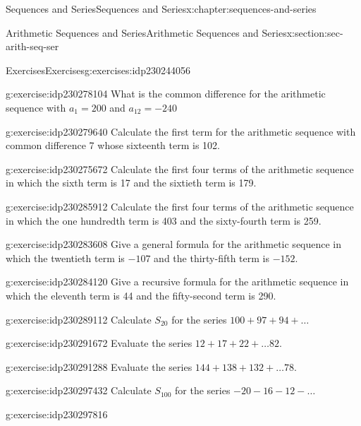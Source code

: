 \documentclass[twoside,10pt,]{book}
\numberwithin{equation}{section}
\begin{document}
\begin{chapterptx}{Sequences and Series}{}{Sequences and Series}{}{}{x:chapter:sequences-and-series}
\begin{sectionptx}{Arithmetic Sequences and Series}{}{Arithmetic Sequences and Series}{}{}{x:section:sec-arith-seq-ser}
\begin{exercises-subsection}{Exercises}{}{Exercises}{}{}{g:exercises:idp230244056}
\begin{divisionexercise}{21}{}{}{g:exercise:idp230278104}%
What is the common difference for the arithmetic sequence with \(a_1 = 200\) and \(a_{12} =  - 240\)\end{divisionexercise}%
\begin{divisionexercise}{22}{}{}{g:exercise:idp230279640}%
Calculate the first term for the arithmetic sequence with common difference 7 whose sixteenth term is 102.\end{divisionexercise}%
\begin{divisionexercise}{23}{}{}{g:exercise:idp230275672}%
Calculate the first four terms of the arithmetic sequence in which the sixth term is 17 and the sixtieth term is 179.\end{divisionexercise}%
\begin{divisionexercise}{24}{}{}{g:exercise:idp230285912}%
Calculate the first four terms of the arithmetic sequence in which the one hundredth term is 403 and the sixty-fourth term is 259.\end{divisionexercise}%
\begin{divisionexercise}{25}{}{}{g:exercise:idp230283608}%
Give a general formula for the arithmetic sequence in which the twentieth term is \(-107\) and the thirty-fifth term is \(-152\).\end{divisionexercise}%
\begin{divisionexercise}{26}{}{}{g:exercise:idp230284120}%
Give a recursive formula for the arithmetic sequence in which the eleventh term is 44 and the fifty-second term is 290.\end{divisionexercise}%
\begin{divisionexercise}{27}{}{}{g:exercise:idp230289112}%
Calculate \(S_{20}\) for the series \(100 + 97 + 94 + \ldots\)\end{divisionexercise}%
\begin{divisionexercise}{28}{}{}{g:exercise:idp230291672}%
Evaluate the series \(12 + 17 + 22 + \ldots 82\).\end{divisionexercise}%
\begin{divisionexercise}{29}{}{}{g:exercise:idp230291288}%
Evaluate the series \(144 + 138 + 132 + \ldots 78\).\end{divisionexercise}%
\begin{divisionexercise}{30}{}{}{g:exercise:idp230297432}%
Calculate \(S_{100}\) for the series \(-20  - 16  - 12 - \ldots\)\end{divisionexercise}%
\begin{divisionexercise}{31}{}{}{g:exercise:idp230297816}%

\end{divisionexercise}
\end{exercises-subsection}
\end{sectionptx}
\end{chapterptx}
\end{document}
